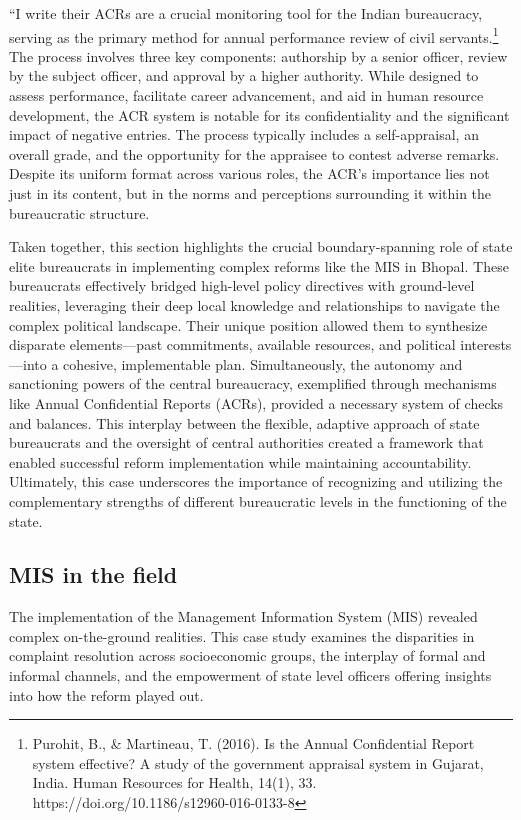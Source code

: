 ``I write their ACRs are a crucial monitoring tool for the Indian bureaucracy, serving as the primary method for annual performance review of civil servants.\footnote{Purohit, B., \& Martineau, T. (2016). Is the Annual Confidential Report system effective? A study of the government appraisal system in Gujarat, India. Human Resources for Health, 14(1), 33. https://doi.org/10.1186/s12960-016-0133-8} The process involves three key components: authorship by a senior officer, review by the subject officer, and approval by a higher authority. While designed to assess performance, facilitate career advancement, and aid in human resource development, the ACR system is notable for its confidentiality and the significant impact of negative entries. The process typically includes a self-appraisal, an overall grade, and the opportunity for the appraisee to contest adverse remarks. Despite its uniform format across various roles, the ACR's importance lies not just in its content, but in the norms and perceptions surrounding it within the bureaucratic structure.

Taken together, this section highlights the crucial boundary-spanning role of state elite bureaucrats in implementing complex reforms like the MIS in Bhopal. These bureaucrats effectively bridged high-level policy directives with ground-level realities, leveraging their deep local knowledge and relationships to navigate the complex political landscape. Their unique position allowed them to synthesize disparate elements—past commitments, available resources, and political interests—into a cohesive, implementable plan. Simultaneously, the autonomy and sanctioning powers of the central bureaucracy, exemplified through mechanisms like Annual Confidential Reports (ACRs), provided a necessary system of checks and balances. This interplay between the flexible, adaptive approach of state bureaucrats and the oversight of central authorities created a framework that enabled successful reform implementation while maintaining accountability. Ultimately, this case underscores the importance of recognizing and utilizing the complementary strengths of different bureaucratic levels in the functioning of the state.

\subsection{MIS in the field}

The implementation of the Management Information System (MIS) revealed complex on-the-ground realities. This case study examines the disparities in complaint resolution across socioeconomic groups, the interplay of formal and informal channels, and the empowerment of state level officers offering insights into how the reform played out.


